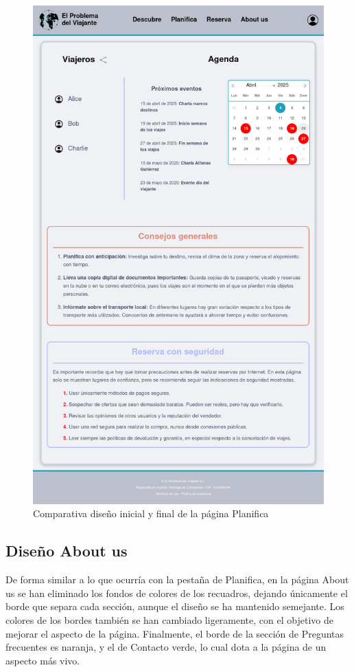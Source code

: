 \documentclass[11pt, a4paper]{book}
\begin{document}
\begin{figure} [H]
\begin{minipage}[c]{0.45\textwidth}
			\includegraphics[width=\textwidth]{full-3.png}
		\end{minipage}
		\caption{Comparativa diseño inicial y final de la página Planifica}
	\end{figure}

	
	\subsection{Diseño About us}
	
	De forma similar a lo que ocurría con la pestaña de Planifica, en la página About us se han eliminado los fondos de colores de los recuadros, dejando únicamente el borde que separa cada sección, aunque el diseño se ha mantenido semejante. Los colores de los bordes también se han cambiado ligeramente, con el objetivo de mejorar el aspecto de la página. Finalmente, el borde de la sección de Preguntas frecuentes es naranja, y el de Contacto verde, lo cual dota a la página de un aspecto más vivo.
	
\end{document}
